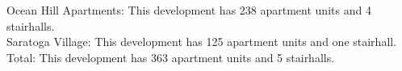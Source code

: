 {Ocean Hill Apartments}: This development has 238 apartment units and 4 stairhalls.\\{Saratoga Village}: This development has 125 apartment units and one stairhall.\\{Total}: This development has 363 apartment units and 5 stairhalls.\\